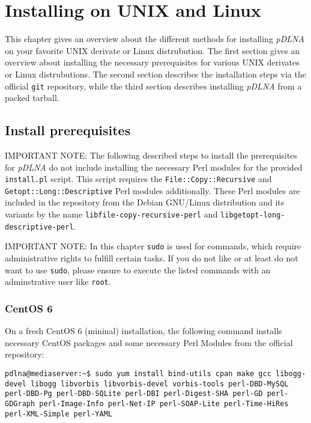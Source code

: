 %
%

\chapter{Installing on UNIX and Linux}
\label{linux}

This chapter gives an overview about the different methods for installing {\em pDLNA} on your favorite UNIX derivate or Linux distrubution. The first section gives an overview about installing the necessary prerequisites for various UNIX derivates or Linux distrubutions. The second section describes the installation steps via the official \verb|git| repository, while the third section describes installing {\em pDLNA} from a packed tarball.

\section{Install prerequisites}
\label{install-prerequisites}

\begin{colframeimportantnote}
\textsc{IMPORTANT NOTE:} The following described steps to install the prerequisites for {\em pDLNA} do not include installing the necessary Perl modules for the provided \verb|install.pl| script. This script requires the \verb|File::Copy::Recursive| and \verb|Getopt::Long::Descriptive| Perl modules additionally. These Perl modules are included in the repository from the Debian GNU/Linux distribution and its variants by the name \verb|libfile-copy-recursive-perl| and \verb|libgetopt-long-descriptive-perl|.
\end{colframeimportantnote}

\begin{colframeimportantnote}
\textsc{IMPORTANT NOTE:} In this chapter \verb|sudo| is used for commands, which require administrative rights to fulfill certain tasks. If you do not like or at least do not want to use \verb|sudo|, please ensure to execute the listed commands with an adminstrative user like \verb|root|.
\end{colframeimportantnote}

\subsection{CentOS 6}

On a fresh CentOS 6 (mininal) installation, the following command installs necessary CentOS packages and some necessary Perl Modules from the official repository:
\begin{lstlisting}
pdlna@mediaserver:~$ sudo yum install bind-utils cpan make gcc libogg-devel libogg libvorbis libvorbis-devel vorbis-tools perl-DBD-MySQL perl-DBD-Pg perl-DBD-SQLite perl-DBI perl-Digest-SHA perl-GD perl-GDGraph perl-Image-Info perl-Net-IP perl-SOAP-Lite perl-Time-HiRes perl-XML-Simple perl-YAML
\end{lstlisting}

